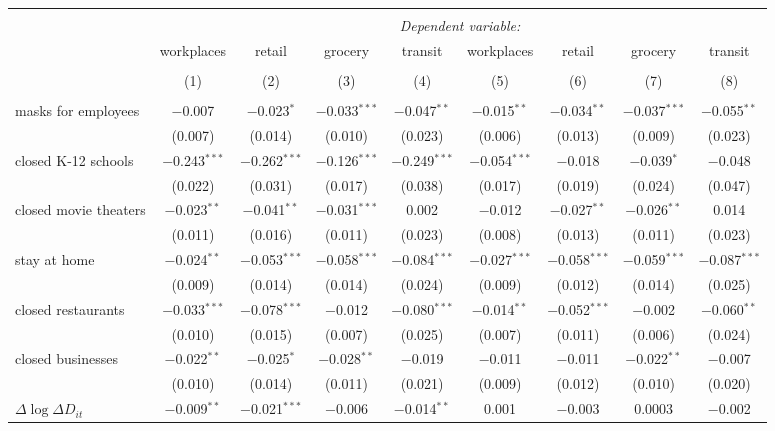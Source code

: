 \begin{tabular}{@{\extracolsep{1pt}}lcccccccc} 
\\[-1.8ex]\hline 
\hline \\[-1.8ex] 
 & \multicolumn{8}{c}{\textit{Dependent variable:}} \\ 
\cline{2-9} 
 & workplaces & retail & grocery & transit & workplaces & retail & grocery & transit \\ 
\\[-1.8ex] & (1) & (2) & (3) & (4) & (5) & (6) & (7) & (8)\\ 
\hline \\[-1.8ex] 
 masks for employees & $-$0.007 & $-$0.023$^{*}$ & $-$0.033$^{***}$ & $-$0.047$^{**}$ & $-$0.015$^{**}$ & $-$0.034$^{**}$ & $-$0.037$^{***}$ & $-$0.055$^{**}$ \\ 
  & (0.007) & (0.014) & (0.010) & (0.023) & (0.006) & (0.013) & (0.009) & (0.023) \\ 
  closed K-12 schools & $-$0.243$^{***}$ & $-$0.262$^{***}$ & $-$0.126$^{***}$ & $-$0.249$^{***}$ & $-$0.054$^{***}$ & $-$0.018 & $-$0.039$^{*}$ & $-$0.048 \\ 
  & (0.022) & (0.031) & (0.017) & (0.038) & (0.017) & (0.019) & (0.024) & (0.047) \\ 
  closed movie theaters & $-$0.023$^{**}$ & $-$0.041$^{**}$ & $-$0.031$^{***}$ & 0.002 & $-$0.012 & $-$0.027$^{**}$ & $-$0.026$^{**}$ & 0.014 \\ 
  & (0.011) & (0.016) & (0.011) & (0.023) & (0.008) & (0.013) & (0.011) & (0.023) \\ 
  stay at home & $-$0.024$^{**}$ & $-$0.053$^{***}$ & $-$0.058$^{***}$ & $-$0.084$^{***}$ & $-$0.027$^{***}$ & $-$0.058$^{***}$ & $-$0.059$^{***}$ & $-$0.087$^{***}$ \\ 
  & (0.009) & (0.014) & (0.014) & (0.024) & (0.009) & (0.012) & (0.014) & (0.025) \\ 
  closed restaurants & $-$0.033$^{***}$ & $-$0.078$^{***}$ & $-$0.012 & $-$0.080$^{***}$ & $-$0.014$^{**}$ & $-$0.052$^{***}$ & $-$0.002 & $-$0.060$^{**}$ \\ 
  & (0.010) & (0.015) & (0.007) & (0.025) & (0.007) & (0.011) & (0.006) & (0.024) \\ 
  closed businesses & $-$0.022$^{**}$ & $-$0.025$^{*}$ & $-$0.028$^{**}$ & $-$0.019 & $-$0.011 & $-$0.011 & $-$0.022$^{**}$ & $-$0.007 \\ 
  & (0.010) & (0.014) & (0.011) & (0.021) & (0.009) & (0.012) & (0.010) & (0.020) \\ 
  $\Delta \log \Delta D_{it}$ & $-$0.009$^{**}$ & $-$0.021$^{***}$ & $-$0.006 & $-$0.014$^{**}$ & 0.001 & $-$0.003 & 0.0003 & $-$0.002 \\ 

\end{tabular}
